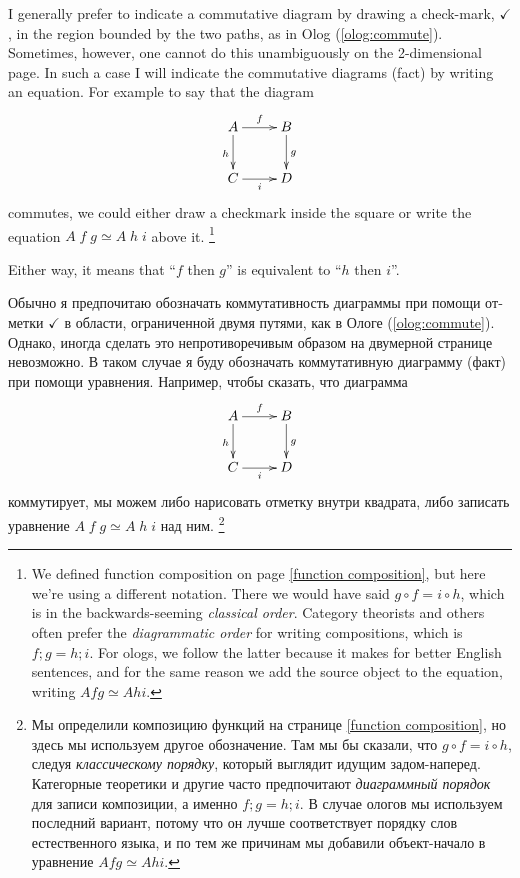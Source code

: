 \documentclass[a4paper]{book}
\theoremstyle{myth}
\begin{document}
\begin{russian}
I generally prefer to indicate a commutative diagram by drawing a check-mark, $\checkmark$, in the region bounded by the two paths, as in Olog (\ref{olog:commute}).  Sometimes, however, one cannot do this unambiguously on the 2-dimensional page.  In such a case I will indicate the commutative diagrams (fact) by writing an equation.  For example to say that the diagram $$\xymatrix{A\ar[r]^f\ar[d]_h&B\ar[d]^g\\C\ar[r]_i&D}$$ commutes, we could either draw a checkmark inside the square or write the equation $A\;f\;g\simeq A\;h\;i$ above it.%
\footnote{We defined function composition on page \ref{function composition}, but here we're using a different notation. There we would have said $g\circ f = i\circ h$, which is in the backwards-seeming {\em classical order}. Category theorists and others often prefer the {\em diagrammatic order} for writing compositions, which is $f;g = h;i$. For ologs, we follow the latter because it makes for better English sentences, and for the same reason we add the source object to the equation, writing $A f g \simeq A h i$.}

Either way, it means that “$f$ then $g$” is equivalent to “$h$ then $i$”.  

Обычно я предпочитаю обозначать коммутативность диаграммы при помощи отметки $\checkmark$ в области, ограниченной двумя путями, как в Ологе (\ref{olog:commute}).  Однако, иногда сделать это непротиворечивым образом на двумерной странице невозможно.  В таком случае я буду обозначать коммутативную диаграмму (факт) при помощи уравнения.  Например, чтобы сказать, что диаграмма $$\xymatrix{A\ar[r]^f\ar[d]_h&B\ar[d]^g\\C\ar[r]_i&D}$$ коммутирует, мы можем либо нарисовать отметку внутри квадрата, либо записать уравнение $A\;f\;g\simeq A\;h\;i$ над ним.%
\footnote{Мы определили композицию функций на странице \ref{function composition}, но здесь мы используем другое обозначение. Там мы бы сказали, что $g\circ f = i\circ h$, следуя {\em классическому порядку}, который выглядит идущим задом-наперед. Категорные теоретики и другие часто предпочитают {\em диаграммный порядок} для записи композиции, а именно $f;g = h;i$. В случае ологов мы используем последний вариант, потому что он лучше соответствует порядку слов естественного языка, и по тем же причинам мы добавили объект-начало в уравнение $A f g \simeq A h i$.}
 

\end{russian}
\end{document}

